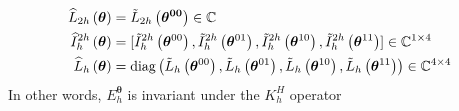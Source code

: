 \documentclass[12pt]{article}
\begin{document}
\begin{theorem}
\begin{align*}
    \widehat{L}_{2h}\left(\boldsymbol{\theta}\right) &= \Tilde{L}_{2h}\left(\boldsymbol{\theta^{00}}\right) \in \mathbb{C} \\
    \widehat{I}_h^{2h}\left(\boldsymbol{\theta}\right) &= [\Tilde{I}_h^{2h}\left(\boldsymbol{\theta}^{00}\right), \Tilde{I}_h^{2h}\left(\boldsymbol{\theta}^{01}\right), \Tilde{I}_h^{2h}\left(\boldsymbol{\theta}^{10}\right), \Tilde{I}_h^{2h}\left(\boldsymbol{\theta}^{11}\right)] \in \mathbb{C}^{1 \times 4} \\
    \widehat{L}_h\left(\boldsymbol{\theta}\right) &= \text{diag} \left(\Tilde{L}_h\left(\boldsymbol{\theta}^{00}\right), \Tilde{L}_h\left(\boldsymbol{\theta}^{01}\right), \Tilde{L}_h\left(\boldsymbol{\theta}^{10}\right), \Tilde{L}_h\left(\boldsymbol{\theta}^{11}\right)\right) \in \mathbb{C}^{4 \times 4}
    \end{align*}
    In other words, $E^{\boldsymbol{\theta}}_h$ is invariant under the $K^H_h$ operator
\end{theorem}
\end{document}
